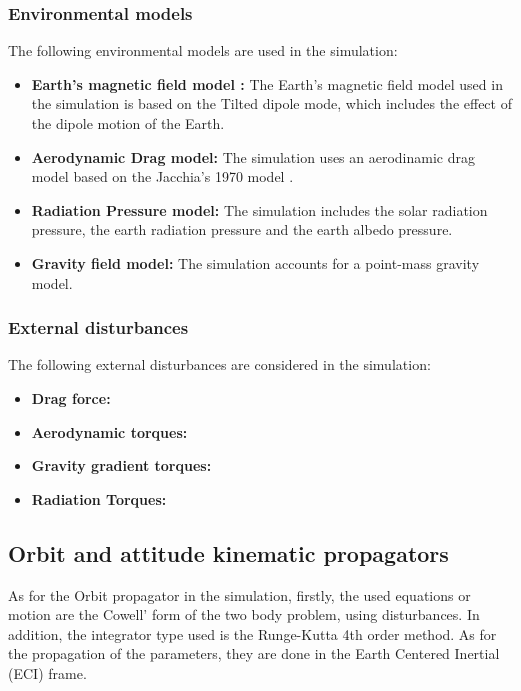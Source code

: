 \subsubsection{Environmental models}
The following environmental models are used in the simulation:
\begin{itemize}
    \item \textbf{Earth's magnetic field model \cite{Tilted_Dipole}:} The Earth's magnetic field model used in the simulation is based
    on the Tilted dipole mode, which includes the effect of the dipole motion of the Earth.
    \item \textbf{Aerodynamic Drag model:} The simulation uses an aerodinamic drag model based on the Jacchia's 1970 model
    \cite{J70_atmosphere}. 
    \item \textbf{Radiation Pressure model:} The simulation includes the solar radiation pressure, the earth radiation
    pressure and the earth albedo pressure.
    \item \textbf{Gravity field model:} The simulation accounts for a point-mass gravity model.
\end{itemize}

\subsubsection{External disturbances}
The following external disturbances are considered in the simulation:
\begin{itemize}
    \item \textbf{Drag force:} 
    \item \textbf{Aerodynamic torques:} 
    \item \textbf{Gravity gradient torques:} 
    \item \textbf{Radiation Torques:} 
\end{itemize}

\subsection{Orbit and attitude kinematic propagators}

As for the Orbit propagator in the simulation, firstly, the used equations or motion are the Cowell'
form of the two body problem, using  disturbances. In addition, the integrator type used is the Runge-Kutta 4th order method.
As for the propagation of the parameters, they are done in the Earth Centered Inertial (ECI) frame.\vspace{0.2em}

